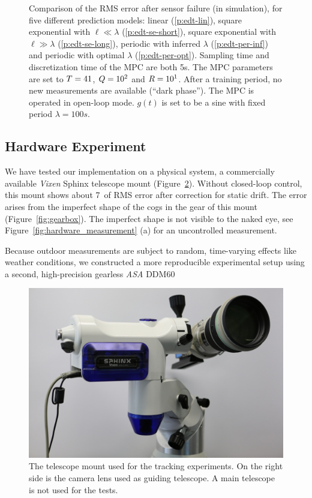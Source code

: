 \begin{figure}%
\centering%
\footnotesize%
%
\caption[Comparison of the RMS error after sensor failure.]{Comparison of the
RMS error after sensor failure (in simulation), for five different prediction
models: linear (\ref*{p:edt-lin}), square exponential with $\ell \ll \lambda$
(\ref*{p:edt-se-short}), square exponential with $\ell \gg \lambda$
(\ref*{p:edt-se-long}), periodic with inferred $\lambda$ (\ref*{p:edt-per-inf})
and periodic with optimal $\lambda$ (\ref*{p:edt-per-opt}). Sampling time and
discretization time of the MPC are both 5\unit{s}. The MPC parameters are set to
$T=41$, $Q=10^2$ and $R=10^1$. After a training period, no new
measurements are available (``dark phase''). The MPC is operated in open-loop
mode. $g(t)$ is set to be a sine with fixed period $\lambda=100\unit{s}$.}
\label{fig:error_vs_darkness}
\end{figure}

\subsection{Hardware Experiment}
\label{sec:hardware}

We have tested our implementation on a physical system, a commercially
available \emph{Vixen} Sphinx telescope mount (Figure~\ref{fig:hardware}).
Without closed-loop control, this mount shows about 7\as~of RMS error after
correction for static drift. The error arises from the imperfect shape of the
cogs in the gear of this mount (Figure~\ref{fig:gearbox}). The imperfect shape
is not visible to the naked eye, see Figure~\ref{fig:hardware_measurement} (a)
for an uncontrolled measurement.

Because outdoor measurements are subject to random, time-varying effects like
weather conditions, we constructed a more reproducible experimental setup using
a second, high-precision gearless \emph{ASA} DDM60
\clearpage

\begin{figure}
\centering%
\footnotesize%
  \includegraphics[width=\columnwidth]{img/mount_1200.jpg}%
  \caption[The telescope mount used for the tracking experiments.]{The telescope
mount used for the tracking experiments. On the right side is the camera lens
used as guiding telescope. A main telescope is not used for the tests.}%
  \label{fig:hardware}%
\end{figure}

